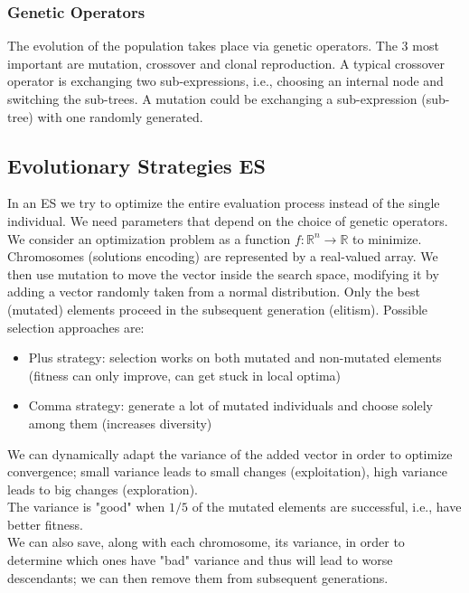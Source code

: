 \subsubsection{Genetic Operators}
The evolution of the population takes place via genetic operators. The 3 most important are mutation, crossover and clonal reproduction. A typical crossover operator is exchanging two sub-expressions, i.e., choosing an internal node and switching the sub-trees. A mutation could be exchanging a sub-expression (sub-tree) with one randomly generated.\\

\subsection{Evolutionary Strategies ES}

In an ES we try to optimize the entire evaluation process instead of the single individual. We need parameters that depend on the choice of genetic operators.\\
We consider an optimization problem as a function $f: \mathbb{R}^n \rightarrow \mathbb{R}$ to minimize. Chromosomes (solutions encoding) are represented by a real-valued array. We then use mutation to move the vector inside the search space, modifying it by adding a vector randomly taken from a normal distribution. Only the best (mutated) elements proceed in the subsequent generation (elitism). Possible selection approaches are:
\begin{itemize}
	\item Plus strategy: selection works on both mutated and non-mutated elements (fitness can only improve, can get stuck in local optima)
	\item Comma strategy: generate a lot of mutated individuals and choose solely among them (increases diversity)
\end{itemize}

We can dynamically adapt the variance of the added vector in order to optimize convergence; small variance leads to small changes (exploitation), high variance leads to big changes (exploration). \\

The variance is "good" when $1/5$ of the mutated elements are successful, i.e., have better fitness.\\
We can also save, along with each chromosome, its variance, in order to determine which ones have "bad" variance and thus will lead to worse descendants; we can then remove them from subsequent generations.\\




